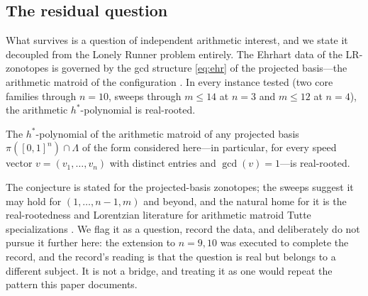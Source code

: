 \subsection{The residual question}

What survives is a question of independent arithmetic interest, and we
state it decoupled from the Lonely Runner problem entirely. The
Ehrhart data of the LR-zonotopes is governed by the gcd structure
\eqref{eq:ehr} of the projected basis---the arithmetic matroid of the
configuration \cite{dAMoci}. In every instance tested (two core
families through $n=10$, sweeps through $m\le14$ at $n=3$ and $m\le12$
at $n=4$), the arithmetic $h^*$-polynomial is real-rooted.

\begin{conjecture}\label{conj:hstarRR}
The $h^*$-polynomial of the arithmetic matroid of any projected basis
$\pi([0,1]^n)\cap\Lambda$ of the form considered here---in particular,
for every speed vector $v=(v_1,\dots,v_n)$ with distinct entries and
$\gcd(v)=1$---is real-rooted.
\end{conjecture}

The conjecture is stated for the projected-basis zonotopes; the sweeps
suggest it may hold for $(1,\dots,n-1,m)$ and beyond, and the natural
home for it is the real-rootedness and Lorentzian literature for
arithmetic matroid Tutte specializations
\cite{BrandenHuh,dAMoci,StanleyEC}. We
flag it as a question, record the data, and deliberately do not pursue
it further here: the extension to $n=9,10$ was executed to complete the
record, and the record's reading is that the question is real but
belongs to a different subject. It is not a bridge, and treating it as
one would repeat the pattern this paper documents.
